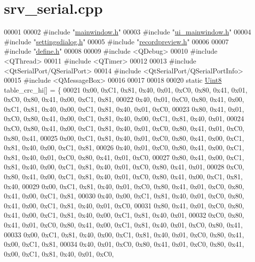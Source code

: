 \hypertarget{a00137_source}{\section{srv\+\_\+serial.\+cpp}
\label{a00137_source}
}

\begin{DoxyCode}
00001 
00002 \textcolor{preprocessor}{#include "\hyperlink{a00110}{mainwindow.h}"}
00003 \textcolor{preprocessor}{#include "\hyperlink{a00139}{ui\_mainwindow.h}"}
00004 \textcolor{preprocessor}{#include "\hyperlink{a00132}{settingsdialog.h}"}
00005 \textcolor{preprocessor}{#include "\hyperlink{a00130}{recordpreview.h}"}
00006 
00007 \textcolor{preprocessor}{#include "\hyperlink{a00090}{define.h}"}
00008 
00009 \textcolor{preprocessor}{#include <QDebug>}
00010 \textcolor{preprocessor}{#include <QThread>}
00011 \textcolor{preprocessor}{#include <QTimer>}
00012 
00013 \textcolor{preprocessor}{#include <QtSerialPort/QSerialPort>}
00014 \textcolor{preprocessor}{#include <QtSerialPort/QSerialPortInfo>}
00015 \textcolor{preprocessor}{#include <QMessageBox>}
00016 
00017 
00018 
00020 \textcolor{keyword}{static} \hyperlink{a00004_a979e3e23b9a449e69ab6a8a83b6042f8}{Uint8} table\_crc\_hi[] = \{
00021 0x00, 0xC1, 0x81, 0x40, 0x01, 0xC0, 0x80, 0x41, 0x01, 0xC0, 0x80, 0x41, 0x00, 0xC1, 0x81,
00022 0x40, 0x01, 0xC0, 0x80, 0x41, 0x00, 0xC1, 0x81, 0x40, 0x00, 0xC1, 0x81, 0x40, 0x01, 0xC0,
00023 0x80, 0x41, 0x01, 0xC0, 0x80, 0x41, 0x00, 0xC1, 0x81, 0x40, 0x00, 0xC1, 0x81, 0x40, 0x01,
00024 0xC0, 0x80, 0x41, 0x00, 0xC1, 0x81, 0x40, 0x01, 0xC0, 0x80, 0x41, 0x01, 0xC0, 0x80, 0x41,
00025 0x00, 0xC1, 0x81, 0x40, 0x01, 0xC0, 0x80, 0x41, 0x00, 0xC1, 0x81, 0x40, 0x00, 0xC1, 0x81,
00026 0x40, 0x01, 0xC0, 0x80, 0x41, 0x00, 0xC1, 0x81, 0x40, 0x01, 0xC0, 0x80, 0x41, 0x01, 0xC0,
00027 0x80, 0x41, 0x00, 0xC1, 0x81, 0x40, 0x00, 0xC1, 0x81, 0x40, 0x01, 0xC0, 0x80, 0x41, 0x01,
00028 0xC0, 0x80, 0x41, 0x00, 0xC1, 0x81, 0x40, 0x01, 0xC0, 0x80, 0x41, 0x00, 0xC1, 0x81, 0x40,
00029 0x00, 0xC1, 0x81, 0x40, 0x01, 0xC0, 0x80, 0x41, 0x01, 0xC0, 0x80, 0x41, 0x00, 0xC1, 0x81,
00030 0x40, 0x00, 0xC1, 0x81, 0x40, 0x01, 0xC0, 0x80, 0x41, 0x00, 0xC1, 0x81, 0x40, 0x01, 0xC0,
00031 0x80, 0x41, 0x01, 0xC0, 0x80, 0x41, 0x00, 0xC1, 0x81, 0x40, 0x00, 0xC1, 0x81, 0x40, 0x01,
00032 0xC0, 0x80, 0x41, 0x01, 0xC0, 0x80, 0x41, 0x00, 0xC1, 0x81, 0x40, 0x01, 0xC0, 0x80, 0x41,
00033 0x00, 0xC1, 0x81, 0x40, 0x00, 0xC1, 0x81, 0x40, 0x01, 0xC0, 0x80, 0x41, 0x00, 0xC1, 0x81,
00034 0x40, 0x01, 0xC0, 0x80, 0x41, 0x01, 0xC0, 0x80, 0x41, 0x00, 0xC1, 0x81, 0x40, 0x01, 0xC0,

\end{DoxyCode}
